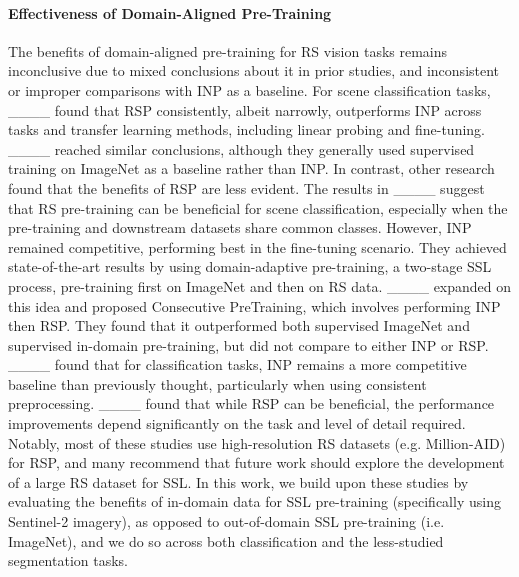 \paragraph{Effectiveness of Domain-Aligned Pre-Training}
The benefits of domain-aligned pre-training for RS vision tasks remains inconclusive due to mixed conclusions about it in prior studies, and inconsistent or improper comparisons with INP as a baseline. For scene classification tasks, ____ found that RSP consistently, albeit narrowly, outperforms INP across tasks and transfer learning methods, including linear probing and fine-tuning. ____ reached similar conclusions, although they generally used supervised  training on ImageNet as a baseline rather than INP. In contrast, other research found that the benefits of RSP are less evident. The results in ____ suggest that RS pre-training can be beneficial for scene classification, especially when the pre-training and downstream datasets share common classes. However, INP remained competitive, performing best in the fine-tuning scenario. They achieved state-of-the-art results by using domain-adaptive pre-training, a two-stage SSL process, pre-training first on ImageNet and then on RS data. ____ expanded on this idea and proposed Consecutive PreTraining, which involves performing INP then RSP. They found that it outperformed both supervised ImageNet and supervised in-domain pre-training, but did not compare to either INP or RSP. ____ found that for classification tasks, INP remains a more competitive baseline than previously thought, particularly when using consistent preprocessing. ____ found that while RSP can be beneficial, the performance improvements depend significantly on the task and level of detail required. Notably, most of these studies use high-resolution RS datasets (e.g. Million-AID) for RSP, and many recommend that future work should explore the development of a large RS dataset for SSL. In this work, we build upon these studies by evaluating the benefits of in-domain data for SSL pre-training (specifically using Sentinel-2 imagery), as opposed to out-of-domain SSL pre-training (i.e. ImageNet), and we do so across both classification and the less-studied segmentation tasks.